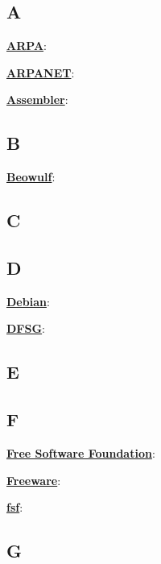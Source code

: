 
\subsection*{A}

\underline{\textbf{ARPA}}: %

\underline{\textbf{ARPANET}}: %

\underline{\textbf{Assembler}}: %

\subsection*{B}

\underline{\textbf{Beowulf}}: %

\subsection*{C}

\subsection*{D}

\underline{\textbf{Debian}}: %

\underline{\textbf{DFSG}}: %

\subsection*{E}

\subsection*{F}

\underline{\textbf{Free Software Foundation}}: %

\underline{\textbf{Freeware}}: %

\underline{\textbf{fsf}}: %

\subsection*{G}

